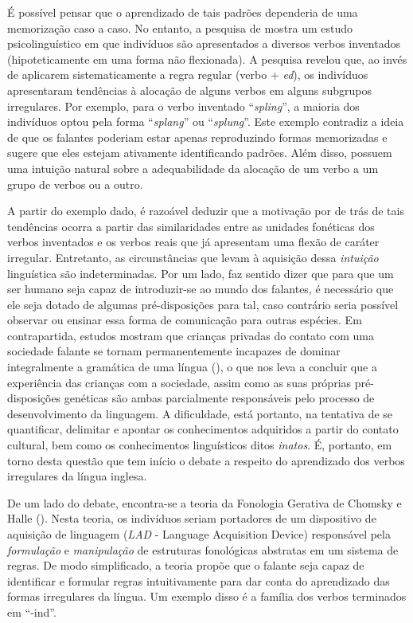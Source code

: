 É possível pensar que o aprendizado de tais padrões dependeria de uma memorização caso a caso. No entanto, a pesquisa de \cite{Bybee:1983} mostra um estudo psicolinguístico em que indivíduos são apresentados a diversos verbos inventados (hipoteticamente em uma forma não flexionada). A pesquisa revelou que, ao invés de aplicarem sistematicamente a regra regular (verbo + \textit{ed}), os indivíduos apresentaram tendências à alocação de alguns verbos em alguns subgrupos irregulares. Por exemplo, para o verbo inventado “\textit{spling}”, a maioria dos indivíduos optou pela forma “\textit{splang}”  ou “\textit{splung}”. Este exemplo contradiz a ideia de que os falantes poderiam estar apenas reproduzindo formas memorizadas e sugere que eles estejam ativamente identificando padrões. Além disso, possuem uma intuição natural sobre a adequabilidade da alocação de um verbo a um grupo de verbos ou a outro. 

A partir do exemplo dado, é razoável deduzir que a motivação por de trás de tais tendências ocorra a partir das similaridades entre as unidades fonéticas dos verbos inventados e os verbos reais que já apresentam uma flexão de caráter irregular. Entretanto, as circunstâncias que levam à aquisição dessa \textit{intuição} linguística são indeterminadas. Por um lado, faz sentido dizer que para que um ser humano seja capaz de introduzir-se ao mundo dos falantes, é necessário que ele seja dotado de algumas pré-disposições para tal, caso contrário seria possível observar ou ensinar essa forma de comunicação para outras espécies. Em contrapartida, estudos mostram que crianças privadas do contato com uma sociedade falante se tornam permanentemente incapazes de dominar integralmente a gramática de uma língua (\cite{Pinker:languageinstinct}), o que nos leva a concluir que a experiência das crianças com a sociedade, assim como as suas próprias pré-disposições genéticas são ambas parcialmente responsáveis pelo processo de desenvolvimento da linguagem. A dificuldade, está portanto, na tentativa de se quantificar, delimitar e apontar os conhecimentos adquiridos a partir do contato cultural, bem como os conhecimentos linguísticos ditos \textit{inatos}. É, portanto, em torno desta questão que tem início o debate a respeito do aprendizado dos verbos irregulares da língua inglesa.

De um lado do debate, encontra-se a teoria da Fonologia Gerativa de Chomsky e Halle (\citeyear{chomsky:1968}). Nesta teoria, os indivíduos seriam portadores de um dispositivo de aquisição de linguagem (\textit{LAD} - Language Acquisition Device) responsável pela \textit{formulação} e \textit{manipulação} de estruturas fonológicas abstratas em um sistema de regras. De modo simplificado, a teoria propõe que o falante seja capaz de identificar e formular regras intuitivamente para dar conta do aprendizado das formas irregulares da língua. Um exemplo disso é a família dos verbos terminados em “-ind”.

